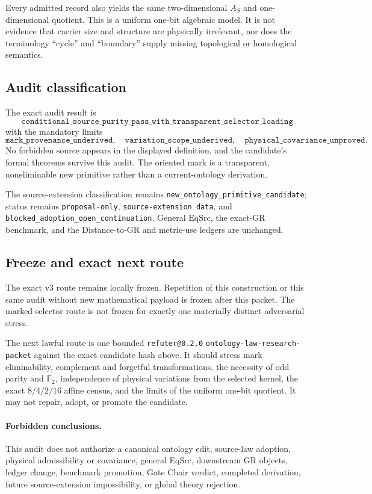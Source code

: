 Every admitted record also yields the same two-dimensional \(A_S\) and
one-dimensional quotient.  This is a uniform one-bit algebraic model.  It is
not evidence that carrier size and structure are physically irrelevant, nor
does the terminology ``cycle'' and ``boundary'' supply missing topological or
homological semantics.

\subsection{Audit classification}

The exact audit result is
\[
\texttt{conditional\_source\_purity\_pass\_with\_transparent\_selector\_loading}
\]
with the mandatory limits
\[
\texttt{mark\_provenance\_underived},\quad
\texttt{variation\_scope\_underived},\quad
\texttt{physical\_covariance\_unproved}.
\]
No forbidden source appears in the displayed definition, and the candidate's
formal theorems survive this audit.  The oriented mark is a transparent,
noneliminable new primitive rather than a current-ontology derivation.

The source-extension classification remains
\texttt{new\_ontology\_primitive\_candidate}; status remains
\texttt{proposal-only}, \texttt{source-extension data}, and
\texttt{blocked\_adoption\_open\_continuation}.  General \(\mathrm{EqSrc}\),
the exact-GR benchmark, and the Distance-to-GR and metric-use ledgers are
unchanged.

\subsection{Freeze and exact next route}

The exact v3 route remains locally frozen.  Repetition of this construction
or this same audit without new mathematical payload is frozen after this
packet.  The marked-selector route is not frozen for exactly one materially
distinct adversarial stress.

The next lawful route is one bounded
\texttt{refuter@0.2.0} \texttt{ontology-law-research-packet} against the exact
candidate hash above.  It should stress mark eliminability, complement and
forgetful transformations, the necessity of odd parity and \(\mathbb F_2\),
independence of physical variations from the selected kernel, the exact
\(8/4/2/16\) affine census, and the limits of the uniform one-bit quotient.
It may not repair, adopt, or promote the candidate.

\paragraph{Forbidden conclusions.}
This audit does not authorize a canonical ontology edit, source-law adoption,
physical admissibility or covariance, general EqSrc, downstream GR objects,
ledger change, benchmark promotion, Gate Chair verdict, completed derivation,
future source-extension impossibility, or global theory rejection.
